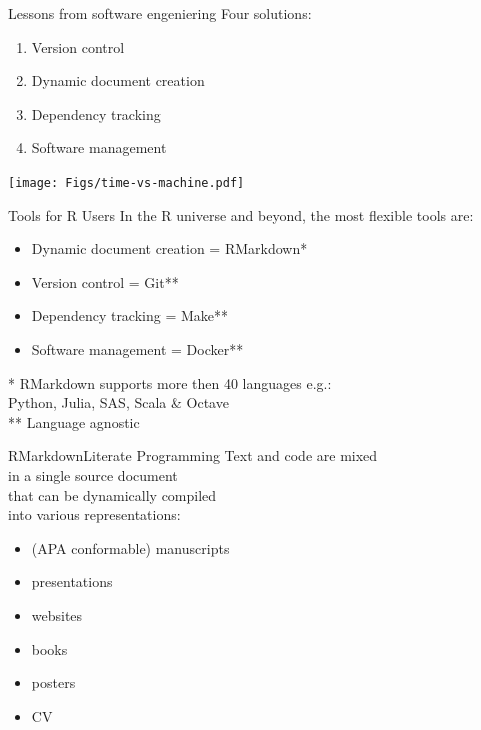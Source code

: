 \documentclass[12pt,t]{beamer}
\begin{document}
{\begin{frame}[c]{Lessons from software engeniering}
Four solutions:
  \begin{enumerate}
    \item \textcolor{vhilit}{Version control}
    \item \textcolor{vhilit}{Dynamic document creation}
    \item \textcolor{hilit}{Dependency tracking}
    \item \textcolor{hilit}{Software management}
  \end{enumerate}
  \hfill \texttt{[image: Figs/time-vs-machine.pdf]}

\end{frame}

\begin{frame}[c]{Tools for R Users}
	In the R universe and beyond, the most flexible tools are:
  \begin{itemize}
    \item Dynamic document creation = RMarkdown*
    \item Version control = Git**
    \item Dependency tracking = Make**
    \item Software management = Docker**
  \end{itemize}
  \vfill
  \textcolor{lolit}{
	* RMarkdown supports more then 40 languages e.g.:\\
	\hspace{10mm}Python, Julia, SAS, Scala \& Octave\\
	** Language agnostic
	}
\end{frame}

\begin{frame}[c]{RMarkdown\textemdash{}Literate Programming}
  Text and code are mixed\\
  in a single source document\\
  that can be \textcolor{hilit}{dynamically} compiled\\
  into various representations:
  \begin{itemize}
    \item (APA conformable) manuscripts
    \item presentations
    \item websites
    \item books
    \item posters
		\item CV
  \end{itemize}
\end{frame}

}
\end{document}
